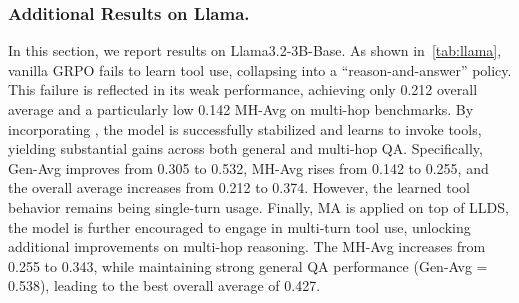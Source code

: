 \subsubsection{Additional Results on Llama.}
In this section, we report results on Llama3.2-3B-Base. As shown in~\cref{tab:llama}, vanilla GRPO fails to learn tool use, collapsing into a “reason-and-answer” policy. This failure is reflected in its weak performance, achieving only 0.212 overall average and a particularly low 0.142 MH-Avg on multi-hop benchmarks. By incorporating \ours{}, the model is successfully stabilized and learns to invoke tools, yielding substantial gains across both general and multi-hop QA. Specifically, Gen-Avg improves from 0.305 to 0.532, MH-Avg rises from 0.142 to 0.255, and the overall average increases from 0.212 to 0.374. However, the learned tool behavior remains being single-turn usage. Finally, MA is applied on top of LLDS, the model is further encouraged to engage in multi-turn tool use, unlocking additional improvements on multi-hop reasoning. The MH-Avg increases from 0.255 to 0.343, while maintaining strong general QA performance (Gen-Avg = 0.538), leading to the best overall average of 0.427. 
\begin{table}[t]
\centering
{}
\caption{Results on General QA and Multi-Hop QA datasets for \textbf{Llama3.2-3b-Base}.}
\label{tab:llama}
\end{table}


